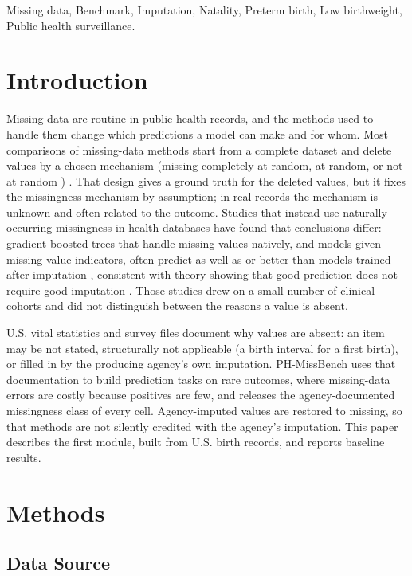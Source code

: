 \documentclass[journal]{IEEEtran}
\begin{document}
\begin{IEEEkeywords}
Missing data, Benchmark, Imputation, Natality, Preterm birth, Low birthweight, Public health surveillance.
\end{IEEEkeywords}

\section{Introduction}

Missing data are routine in public health records, and the methods used to handle them change which predictions a model can make and for whom. Most comparisons of missing-data methods start from a complete dataset and delete values by a chosen mechanism (missing completely at random, at random, or not at random \cite{rubin1976}) \cite{jager2021,jarrett2022}. That design gives a ground truth for the deleted values, but it fixes the missingness mechanism by assumption; in real records the mechanism is unknown and often related to the outcome. Studies that instead use naturally occurring missingness in health databases have found that conclusions differ: gradient-boosted trees that handle missing values natively, and models given missing-value indicators, often predict as well as or better than models trained after imputation \cite{perezlebel2022,lemorvan2025}, consistent with theory showing that good prediction does not require good imputation \cite{josse2019}. Those studies drew on a small number of clinical cohorts and did not distinguish between the reasons a value is absent.

U.S. vital statistics and survey files document why values are absent: an item may be not stated, structurally not applicable (a birth interval for a first birth), or filled in by the producing agency's own imputation. PH-MissBench uses that documentation to build prediction tasks on rare outcomes, where missing-data errors are costly because positives are few, and releases the agency-documented missingness class of every cell. Agency-imputed values are restored to missing, so that methods are not silently credited with the agency's imputation. This paper describes the first module, built from U.S. birth records, and reports baseline results.

\section{Methods}

\subsection{Data Source}
\end{document}
